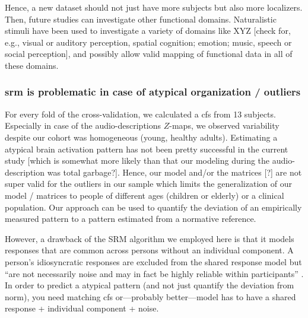 %
Hence, a new dataset should not just have more subjects but also more
localizers.
%
Then, future studies can investigate other functional domains.
%
Naturalistic stimuli have been used to investigate a variety of domains like XYZ
[check for, e.g., visual or auditory perception, spatial cognition; emotion;
music, speech or social perception], and possibly allow valid mapping of
functional data in all of these domains.


\subsubsection{\ac{srm} is problematic in case of atypical organization /
outliers}



%
For every fold of the cross-validation, we calculated a \ac{cfs} from 13
subjects.
%
Especially in case of the audio-descriptions $Z$-maps, we observed variability
despite our cohort was homogeneous (young, healthy adults).
%
Estimating a atypical brain activation pattern has not been pretty successful in
the current study [which is somewhat more likely than that our modeling during
the audio-description was total garbage?].
%
Hence, our model and/or the matrices [?] are not super valid for the outliers in
our sample which limits the generalization of our model / matrices to people of
different ages (children or elderly) or a clinical population.
%
Our approach can be used to quantify the deviation of an empirically measured
pattern to a pattern estimated from a normative reference.
%

However, a drawback of the SRM algorithm we employed here is that it models
responses that are common across persons without an individual component.
%
A person's idiosyncratic responses are excluded from the shared response model
but ``are not necessarily noise and may in fact be highly reliable within
participants'' \citep{cohen2017computational}.
%
In order to predict a atypical pattern (and not just quantify the deviation from
norm), you need matching \ac{cfs} or---probably better---model has to have a
shared response + individual component + noise.


